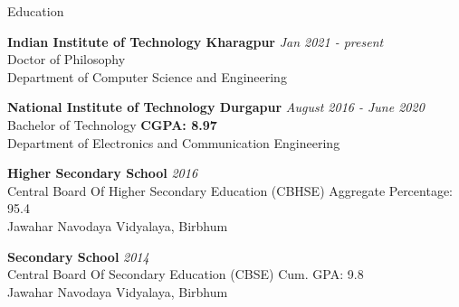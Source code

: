 \documentclass{resume} %
\begin{document}
	\begin{rSection}{Education}
		
		{\bf Indian Institute of Technology Kharagpur} \hfill {\em Jan 2021 - present} 
		\\ Doctor of Philosophy\hfill { }
		\\ Department of Computer Science and Engineering
		
		
		{\bf National Institute of Technology Durgapur} \hfill {\em August 2016 - June 2020} 
		\\ Bachelor of Technology \hfill { \textbf{CGPA: 8.97}}
		\\ Department of Electronics and Communication Engineering  
		
		{\bf Higher Secondary School}  \hfill {\em 2016}
		\\Central Board Of Higher Secondary Education (CBHSE) \hfill { Aggregate Percentage: 95.4}
		\\Jawahar Navodaya Vidyalaya, Birbhum
		
		{\bf Secondary School}  \hfill {\em 2014}
		\\ Central Board Of Secondary Education (CBSE) \hfill { Cum. GPA: 9.8}
		\\Jawahar Navodaya Vidyalaya, Birbhum
		
		
		
	\end{rSection}
	
\end{document}
